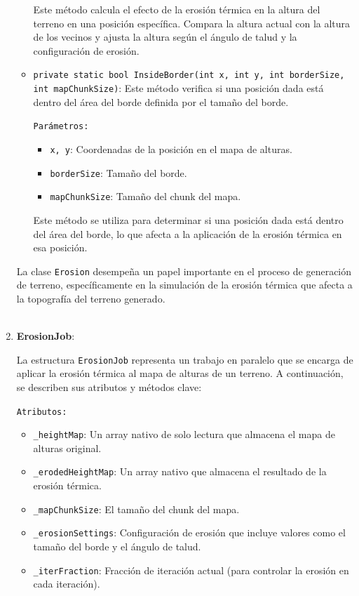 \begin{enumerate}
\begin{itemize}
        Este método calcula el efecto de la erosión térmica en la altura del terreno en una posición específica. Compara la altura actual con la altura de los vecinos y ajusta la altura según el ángulo de talud y la configuración de erosión.

        \item \texttt{private static bool InsideBorder(int x, int y, int borderSize, int mapChunkSize)}: Este método verifica si una posición dada está dentro del área del borde definida por el tamaño del borde.

        \texttt{Parámetros:}

        \begin{itemize}
            \item \texttt{x, y}: Coordenadas de la posición en el mapa de alturas.
            \item \texttt{borderSize}: Tamaño del borde.
            \item \texttt{mapChunkSize}: Tamaño del chunk del mapa.
        \end{itemize}

        Este método se utiliza para determinar si una posición dada está dentro del área del borde, lo que afecta a la aplicación de la erosión térmica en esa posición.

    \end{itemize}

    La clase \texttt{Erosion} desempeña un papel importante en el proceso de generación de terreno, específicamente en la simulación de la erosión térmica que afecta a la topografía del terreno generado.\\
    \\

    \item \textbf{ErosionJob}:

    La estructura \texttt{ErosionJob} representa un trabajo en paralelo que se encarga de aplicar la erosión térmica al mapa de alturas de un terreno. A continuación, se describen sus atributos y métodos clave:

    \texttt{Atributos:}

    \begin{itemize}
        \item \texttt{\_heightMap}: Un array nativo de solo lectura que almacena el mapa de alturas original.
        \item \texttt{\_erodedHeightMap}: Un array nativo que almacena el resultado de la erosión térmica.
        \item \texttt{\_mapChunkSize}: El tamaño del chunk del mapa.
        \item \texttt{\_erosionSettings}: Configuración de erosión que incluye valores como el tamaño del borde y el ángulo de talud.
        \item \texttt{\_iterFraction}: Fracción de iteración actual (para controlar la erosión en cada iteración).
    \end{itemize}


\end{enumerate}
